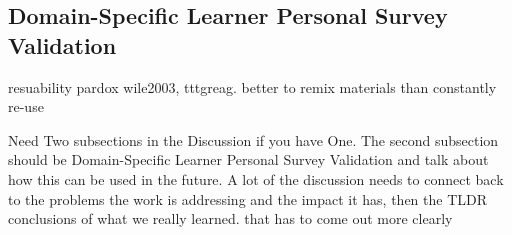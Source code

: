 \documentclass[020-persona\_validation.tex]{subfiles}
\begin{document}
    \subsection{Domain-Specific Learner Personal Survey Validation}

    resuability pardox wile2003, tttgreag. better to remix materials than constantly re-use

    Need Two subsections in the Discussion if you have One. The second subsection should be Domain-Specific Learner Personal Survey Validation and talk about how this can be used in the future. A lot of the discussion needs to connect back to the problems the work is addressing and the impact it has, then the TLDR conclusions of what we really learned. that has to come out more clearly
\end{document}
